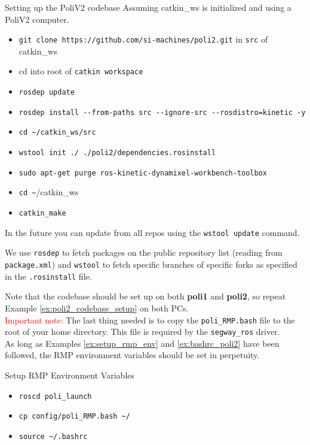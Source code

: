 \begin{example}{Setting up the PoliV2 codebase}
  \label{ex:poli2_codebase_setup}
  Assuming catkin\_ws is initialized and using a PoliV2 computer. \\
  \begin{itemize}
    \item \texttt{git clone https://github.com/si-machines/poli2.git} in \texttt{src} of catkin\_ws
    \item cd into root of \texttt{catkin workspace}
    \item \texttt{rosdep update}
    \item \texttt{rosdep install -{}-from-paths src -{}-ignore-src -{}-rosdistro=kinetic -y}
    \item \texttt{cd \textasciitilde/catkin\_ws/src} 
	\item \texttt{wstool init ./ ./poli2/dependencies.rosinstall}
    \item \texttt{sudo apt-get purge ros-kinetic-dynamixel-workbench-toolbox}
    \item \texttt{cd \textasciitilde}/catkin\_ws
    \item \texttt{catkin\_make}
  \end{itemize}
  In the future you can update from all repos using the \texttt{wstool update} command.
\end{example}


We use \texttt{rosdep} to fetch packages on the public repository list (reading from \texttt{package.xml}) and \texttt{wstool} to fetch specific branches of specific forks as specified in the \texttt{.rosinstall} file.

Note that the codebase should be set up on both \textbf{poli1} and \textbf{poli2}, so repeat Example \ref{ex:poli2_codebase_setup} on both PCs. \\

\textcolor{red}{Important note:} The last thing needed is to copy the \texttt{poli\_RMP.bash} file to the root of your home directory. 
This file is required by the \texttt{segway\_ros} driver. \\
As long as Examples \ref{ex:setup_rmp_env} and \ref{ex:bashrc_poli2} have been followed, the RMP environment variables should be set in perpetuity. 

\begin{example}{Setup RMP Environment Variables}\label{ex:setup_rmp_env}
\begin{itemize}
  \item \texttt{roscd poli\_launch}
  \item \texttt{cp config/poli\_RMP.bash \textasciitilde/}
  \item \texttt{source \textasciitilde/.bashrc}
\end{itemize}
\end{example}



